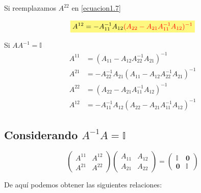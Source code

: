 \documentclass[12pt]{article}
\newcommand{\highlight}[2][yellow]{\mathchoice%
  {\colorbox{#1}{$\displaystyle#2$}}%
  {\colorbox{#1}{$\textstyle#2$}}%
  {\colorbox{#1}{$\scriptstyle#2$}}%
  {\colorbox{#1}{$\scriptscriptstyle#2$}}}%
\begin{document}
Si reemplazamos \color{red} $A^{22}$ \color{black} en \eqref{ecuacion1.7}

\begin{align*} 
    \highlight[yellow!50!white]{ A^{12} = -A_{11}^{-1}A_{12}\color{red} (A_{22} - A_{21}A_{11}^{-1}A_{12})^{-1}}
\end{align*}



\begin{center}
\begin{tcolorbox}[colback=blue!10!white ,colframe=white,width=11 cm]
\large \sffamily Si $AA^{-1} = \mathbb{I}$
\begin{align*}
    A^{11} &= (A_{11} - A_{12}A_{22}^{-1}A_{21})^{-1} \\
    A^{21} &= -A_{22}^{-1}A_{21} (A_{11} - A_{12}A_{22}^{-1}A_{21})^{-1}\\
    A^{22} &= (A_{22} - A_{21}A_{11}^{-1}A_{12} )^{-1}\\
    A^{12} &= -A_{11}^{-1}A_{12}(A_{22} - A_{21}A_{11}^{-1}A_{12})^{-1}
\end{align*}
\end{tcolorbox}
\end{center}




\newpage
\subsection*{Considerando $A^{-1} A = \mathbb{I}$}


\begin{equation*}
    \begin{pmatrix} A^{11} & A^{12}\\ A^{21} & A^{22} \end{pmatrix}\begin{pmatrix} A_{11} & A_{12}\\ A_{21} & A_{22} \end{pmatrix} = \begin{pmatrix} \mathbb{I} & \textbf{0} \\ \textbf{0} & \mathbb{I} \end{pmatrix}
\end{equation*}

 De aquí podemos obtener las siguientes relaciones:
\end{document}
